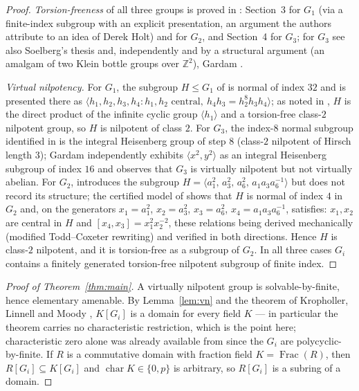 \documentclass[10pt,a4paper]{amsart}
\newcommand{\GOne}{G_1}
\newcommand{\GTwo}{G_2}
\newcommand{\GThree}{G_3}
\newcommand{\Z}{\mathbb{Z}}
\begin{document}
\begin{proof}
\emph{Torsion-freeness} of all three groups is proved in \cite{NS}:
Section~3 for $\GOne$ (via a finite-index subgroup with an explicit
presentation, an argument the authors attribute to an idea of Derek Holt)
and for $\GTwo$, and Section~4 for $\GThree$; for $\GThree$ see also
Soelberg's thesis \cite[Theorem 3.1]{Soelberg} and, independently and by a
structural argument (an amalgam of two Klein bottle groups over $\Z^2$),
Gardam \cite[\S4]{GardamC}.

\emph{Virtual nilpotency.} For $\GOne$, the subgroup $H\le\GOne$ of
\cite[(3.2)]{NS} is normal of index $32$ and is presented there as
$\langle h_1,h_2,h_3,h_4 : h_1,h_2 \text{ central},\
h_4h_3=h_2^8h_3h_4\rangle$; as noted in \cite{NS}, $H$ is the direct
product of the infinite cyclic group $\langle h_1\rangle$ and a
torsion-free class-$2$ nilpotent group, so $H$ is nilpotent of class $2$.
For $\GThree$, the index-$8$ normal subgroup identified in
\cite[Theorem 3.1]{Soelberg} is the integral Heisenberg group of step $8$
(class-$2$ nilpotent of Hirsch length $3$); Gardam \cite[\S4]{GardamC}
independently exhibits $\langle x^2,y^2\rangle$ as an integral Heisenberg
subgroup of index $16$ and observes that $\GThree$ is virtually nilpotent
but not virtually abelian. For $\GTwo$, \cite{NS} introduces the subgroup
$H=\langle a_1^2,\,a_3^2,\,a_6^2,\,a_1a_3a_6^{-1}\rangle$ but does not
record its structure; the certified model of \cite[\S2]{companion} shows
that $H$ is normal of index $4$ in $\GTwo$ and, on the generators
$x_1=a_1^2$, $x_2=a_3^2$, $x_3=a_6^2$, $x_4=a_1a_3a_6^{-1}$, satisfies:
$x_1,x_2$ are central in $H$ and $[x_4,x_3]=x_1^2x_2^{-2}$, these relations
being derived mechanically (modified Todd--Coxeter rewriting) and verified
in both directions. Hence $H$ is class-$2$ nilpotent, and it is
torsion-free as a subgroup of $\GTwo$. In all three cases $G_i$ contains a
finitely generated torsion-free nilpotent subgroup of finite index.
\end{proof}


\begin{proof}[Proof of Theorem~\ref{thm:main}]
A virtually nilpotent group is solvable-by-finite, hence elementary
amenable. By Lemma~\ref{lem:vn} and the theorem of Kropholler, Linnell and
Moody \cite[Theorem 1.4]{KLM}, $K[G_i]$ is a domain for every field $K$ ---
in particular the theorem carries no characteristic restriction, which is
the point here; characteristic zero alone was already available from
\cite{Brown,FS} since the $G_i$ are polycyclic-by-finite. If $R$ is a
commutative domain with fraction field $K=\operatorname{Frac}(R)$, then
$R[G_i]\subseteq K[G_i]$ and $\operatorname{char}K\in\{0,p\}$ is arbitrary,
so $R[G_i]$ is a subring of a domain.
\end{proof}
\end{document}
